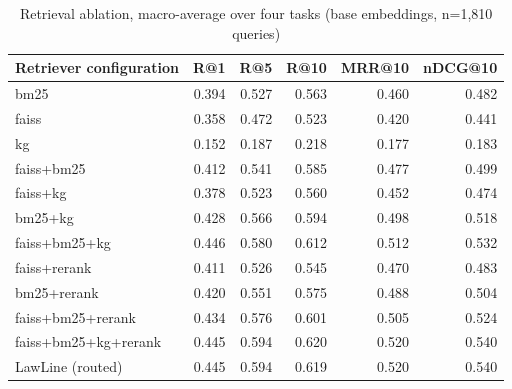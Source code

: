 \begin{table}
\caption{Retrieval ablation, macro-average over four tasks (base embeddings, n=1,810 queries)}
\label{tab:ablation_base}
\begin{tabular}{lrrrrr}
\toprule
Retriever configuration & R@1 & R@5 & R@10 & MRR@10 & nDCG@10 \\
\midrule
bm25 & 0.394 & 0.527 & 0.563 & 0.460 & 0.482 \\
faiss & 0.358 & 0.472 & 0.523 & 0.420 & 0.441 \\
kg & 0.152 & 0.187 & 0.218 & 0.177 & 0.183 \\
faiss+bm25 & 0.412 & 0.541 & 0.585 & 0.477 & 0.499 \\
faiss+kg & 0.378 & 0.523 & 0.560 & 0.452 & 0.474 \\
bm25+kg & 0.428 & 0.566 & 0.594 & 0.498 & 0.518 \\
faiss+bm25+kg & 0.446 & 0.580 & 0.612 & 0.512 & 0.532 \\
faiss+rerank & 0.411 & 0.526 & 0.545 & 0.470 & 0.483 \\
bm25+rerank & 0.420 & 0.551 & 0.575 & 0.488 & 0.504 \\
faiss+bm25+rerank & 0.434 & 0.576 & 0.601 & 0.505 & 0.524 \\
faiss+bm25+kg+rerank & 0.445 & 0.594 & 0.620 & 0.520 & 0.540 \\
LawLine (routed) & 0.445 & 0.594 & 0.619 & 0.520 & 0.540 \\
\bottomrule
\end{tabular}
\end{table}
